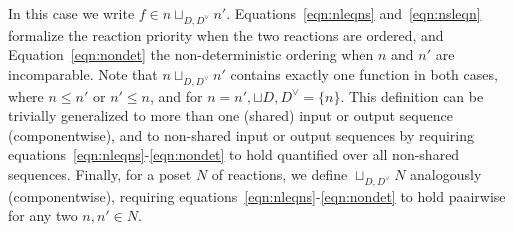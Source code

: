 In this case we write $f \in n \sqcup_{D,D^\vee} n'$.
Equations~\ref{eqn:nleqns} and~\ref{eqn:nsleqn} formalize the reaction priority when the two reactions are ordered, and Equation~\ref{eqn:nondet} the non-deterministic ordering when $n$ and $n'$ are incomparable.
Note that $n \sqcup_{D,D^\vee} n'$ contains exactly one function in both cases, where $n \leq n'$ or $n' \leq n$, and for $n = n', \sqcup{D,D^\vee} = \{ n \}$.
This definition can be trivially generalized to more than one (shared) input or output sequence (componentwise), and to non-shared input or output sequences by requiring equations~\ref{eqn:nleqns}-\ref{eqn:nondet} to hold quantified over all non-shared sequences.
Finally, for a \ac{poset} $N$ of reactions, we define $\sqcup_{D,D^\vee} N$ analogously (componentwise), requiring equations~\ref{eqn:nleqns}-\ref{eqn:nondet} to hold paairwise for any two $n, n' \in N$.

